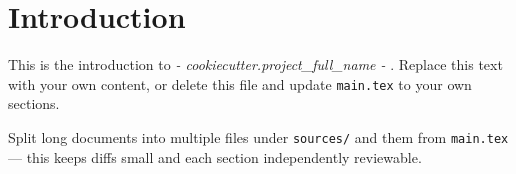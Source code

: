 \section{Introduction}
\label{sec:introduction}

This is the introduction to \emph{ {{- cookiecutter.project_full_name -}} }.
Replace this text with your own content, or delete this file and update
\texttt{main.tex} to \verb|| your own sections.

Split long documents into multiple files under \texttt{sources/} and
\verb|| them from \texttt{main.tex} — this keeps diffs small and each
section independently reviewable.
